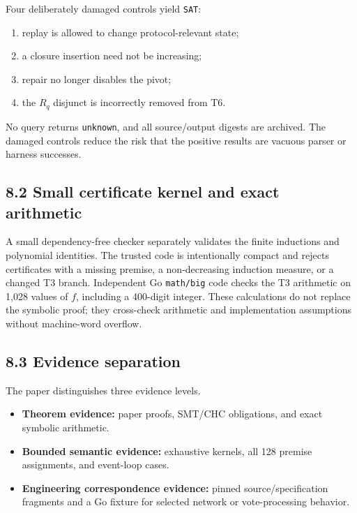 \documentclass[10pt,a4paper]{article}
\newcommand{\tightlist}{\setlength{\itemsep}{0pt}\setlength{\parskip}{0pt}}
\begin{document}
Four deliberately damaged controls yield \texttt{SAT}:

\begin{enumerate}
\def\labelenumi{\arabic{enumi}.}
\tightlist
\item
  replay is allowed to change protocol-relevant state;
\item
  a closure insertion need not be increasing;
\item
  repair no longer disables the pivot;
\item
  the \(R_q\) disjunct is incorrectly removed from T6.
\end{enumerate}

No query returns \texttt{unknown}, and all source/output digests are
archived. The damaged controls reduce the risk that the positive results
are vacuous parser or harness successes.

\subsection{8.2 Small certificate kernel and exact
arithmetic}\label{small-certificate-kernel-and-exact-arithmetic}

A small dependency-free checker separately validates the finite
inductions and polynomial identities. The trusted code is intentionally
compact and rejects certificates with a missing premise, a
non-decreasing induction measure, or a changed T3 branch. Independent Go
\texttt{math/big} code checks the T3 arithmetic on 1,028 values of
\(f\), including a 400-digit integer. These calculations do not replace
the symbolic proof; they cross-check arithmetic and implementation
assumptions without machine-word overflow.

\subsection{8.3 Evidence separation}\label{evidence-separation}

The paper distinguishes three evidence levels.

\begin{itemize}
\tightlist
\item
  \textbf{Theorem evidence:} paper proofs, SMT/CHC obligations, and
  exact symbolic arithmetic.
\item
  \textbf{Bounded semantic evidence:} exhaustive kernels, all 128
  premise assignments, and event-loop cases.
\item
  \textbf{Engineering correspondence evidence:} pinned
  source/specification fragments and a Go fixture for selected network
  or vote-processing behavior.
\end{itemize}
\end{document}
